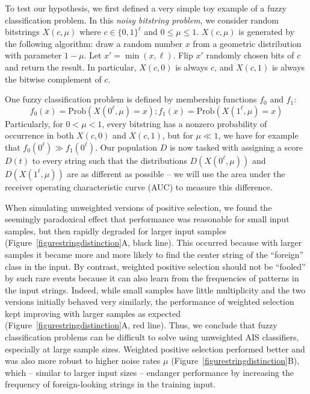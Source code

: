 \documentclass{llncs}
\newcommand{\text}[1]{\textrm{#1}}
\begin{document}
To test our hypothesis, we first defined a very simple toy example of a
fuzzy classification problem. In this \emph{noisy bitstring problem}, we consider
random bitstrings $X(c,\mu)$ where $c \in \{0,1\}^\ell$ and $0 \leq \mu \leq 1$. 
$X(c,\mu)$ is generated by the following algorithm: draw a random number
$x$ from a geometric distribution with parameter $1-\mu$. Let $x' = \min(x,\ell)$.
Flip $x'$ randomly chosen bits of $c$ and return the result.
In particular, $X(c,0)$ is always $c$, and $X(c,1)$ is always the bitwise
complement of $c$. 

One fuzzy classification problem is defined by%
membership functions $f_0$ and $f_1$:
$$
f_0( x ) = \text{Prob}( X(0^\ell,\mu)=x ) ; f_1( x ) = \text{Prob}( X(1^\ell,\mu)=x ) 
$$
Particularly, for $0 < \mu < 1$, every bitstring has a nonzero 
probability of occurrence in both $X(c,0)$ and $X(c,1)$, but for $\mu \ll 1$, we
have for example that $f_0( 0^\ell ) \gg f_1( 0^\ell )$. Our population $D$ 
is now tasked  with assigning a score $D(t)$ to every string such that the 
distributions $D(X(0^\ell,\mu))$ and $D(X(1^\ell,\mu))$ are as different as 
possible -- we will use the area under the receiver operating characteristic
curve (AUC)  to measure this difference.




When simulating unweighted versions of positive selection, we found the seemingly paradoxical 
effect that performance was reasonable for small input samples, but then rapidly degraded for larger
input samples (Figure~\ref{figurestringdistinction}A, black line). This occurred because with larger samples it became more and more likely to find the 
center string of the ``foreign'' class in the input.
By contrast, weighted positive selection 
should not be ``fooled'' by such rare events because it can also learn from the frequencies of
patterns in the input strings. Indeed, while small
samples have little multiplicity and the two versions initially behaved very similarly, the performance
of weighted selection kept improving with larger samples as expected (Figure~\ref{figurestringdistinction}A, red line).
Thus, we conclude that fuzzy classification problems can be difficult to solve using
unweighted AIS classifiers, especially at large sample sizes.
Weighted positive selection performed better and was also more robust to higher noise 
rates $\mu$ (Figure~\ref{figurestringdistinction}B), which -- similar to larger input 
sizes -- endanger performance by increasing the frequency of foreign-looking 
strings in the training input.
\end{document}
